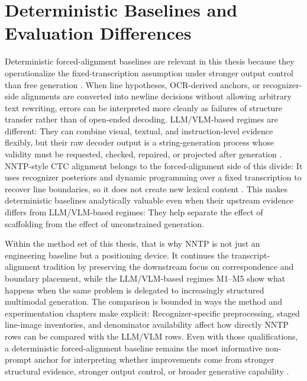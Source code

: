 \section{Deterministic Baselines and Evaluation Differences}
\label{sec:sota_deterministic_baselines}

Deterministic forced-alignment baselines are relevant in this thesis because they operationalize the fixed-transcription assumption under stronger output control than free generation . When line hypotheses, OCR-derived anchors, or recognizer-side alignments are converted into newline decisions without allowing arbitrary text rewriting, errors can be interpreted more cleanly as failures of structure transfer rather than of open-ended decoding. LLM/VLM-based regimes are different: They can combine visual, textual, and instruction-level evidence flexibly, but their raw decoder output is a string-generation process whose validity must be requested, checked, repaired, or projected after generation . NNTP-style CTC alignment belongs to the forced-alignment side of this divide: It uses recognizer posteriors and dynamic programming over a fixed transcription to recover line boundaries, so it does not create new lexical content . This makes deterministic baselines analytically valuable even when their upstream evidence differs from LLM/VLM-based regimes: They help separate the effect of scaffolding from the effect of unconstrained generation.

Within the method set of this thesis, that is why NNTP is not just an engineering baseline but a positioning device. It continues the transcript-alignment tradition by preserving the downstream focus on correspondence and boundary placement, while the LLM/VLM-based regimes M1--M5 show what happens when the same problem is delegated to increasingly structured multimodal generation. The comparison is bounded in ways the method and experimentation chapters make explicit: Recognizer-specific preprocessing, staged line-image inventories, and denominator availability affect how directly NNTP rows can be compared with the LLM/VLM rows. Even with those qualifications, a deterministic forced-alignment baseline remains the most informative non-prompt anchor for interpreting whether improvements come from stronger structural evidence, stronger output control, or broader generative capability .

